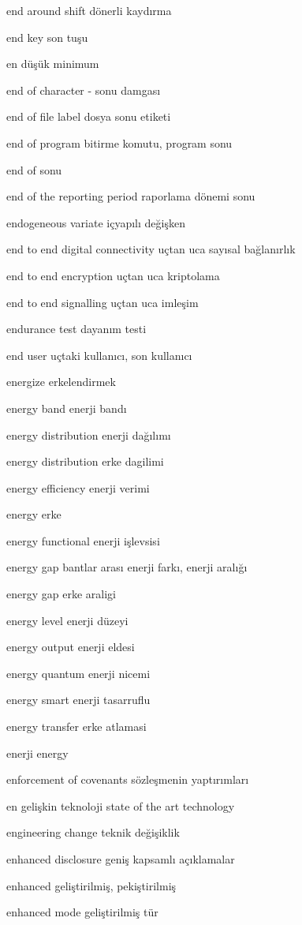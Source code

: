 \documentclass[12pt,fleqn]{article}\usepackage{../../common}
\begin{document}
end around shift dönerli kaydırma

end key son tuşu

en düşük minimum

end of character - sonu damgası

end of file label dosya sonu etiketi

end of program bitirme komutu, program sonu

end of sonu

end of the reporting period raporlama dönemi sonu

endogeneous variate içyapılı değişken

end to end digital connectivity uçtan uca sayısal bağlanırlık

end to end encryption uçtan uca kriptolama

end to end signalling uçtan uca imleşim

endurance test dayanım testi

end user uçtaki kullanıcı, son kullanıcı

energize erkelendirmek

energy band enerji bandı

energy distribution enerji dağılımı

energy distribution erke dagilimi

energy efficiency enerji verimi

energy erke

energy functional enerji işlevsisi

energy gap bantlar arası enerji farkı, enerji aralığı

energy gap erke araligi

energy level enerji düzeyi

energy output enerji eldesi

energy quantum enerji nicemi

energy smart enerji tasarruflu

energy transfer erke atlamasi

enerji energy

enforcement of covenants sözleşmenin yaptırımları

en gelişkin teknoloji state of the art technology

engineering change teknik değişiklik

enhanced disclosure geniş kapsamlı açıklamalar

enhanced geliştirilmiş, pekiştirilmiş

enhanced mode geliştirilmiş tür
\end{document}

